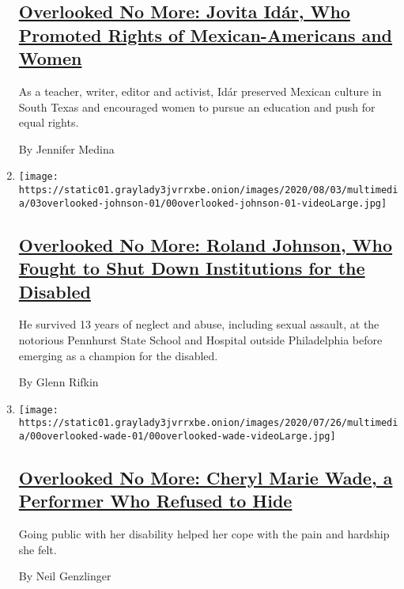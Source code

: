 \begin{enumerate}
{  \subsection{\texorpdfstring{\href{/2020/08/07/obituaries/jovita-idar-overlooked.html}{Overlooked
  No More: Jovita Idár, Who Promoted Rights of Mexican-Americans and
  Women}}{Overlooked No More: Jovita Idár, Who Promoted Rights of Mexican-Americans and Women}}\label{overlooked-no-more-jovita-iduxe1r-who-promoted-rights-of-mexican-americans-and-women}}

  As a teacher, writer, editor and activist, Idár preserved Mexican
  culture in South Texas and encouraged women to pursue an education and
  push for equal rights.

  By Jennifer Medina
\item
  \texttt{[image: https://static01.graylady3jvrrxbe.onion/images/2020/08/03/multimedia/03overlooked-johnson-01/00overlooked-johnson-01-videoLarge.jpg]}

  \hypertarget{overlooked-no-more-roland-johnson-who-fought-to-shut-down-institutions-for-the-disabled}{%
  \subsection{\texorpdfstring{\href{/2020/07/31/obituaries/roland-johnson-overlooked.html}{Overlooked
  No More: Roland Johnson, Who Fought to Shut Down Institutions for the
  Disabled}}{Overlooked No More: Roland Johnson, Who Fought to Shut Down Institutions for the Disabled}}\label{overlooked-no-more-roland-johnson-who-fought-to-shut-down-institutions-for-the-disabled}}

  He survived 13 years of neglect and abuse, including sexual assault,
  at the notorious Pennhurst State School and Hospital outside
  Philadelphia before emerging as a champion for the disabled.

  By Glenn Rifkin
\item
  \texttt{[image: https://static01.graylady3jvrrxbe.onion/images/2020/07/26/multimedia/00overlooked-wade-01/00overlooked-wade-videoLarge.jpg]}

  \hypertarget{overlooked-no-more-cheryl-marie-wade-a-performer-who-refused-to-hide}{%
  \subsection{\texorpdfstring{\href{/2020/07/23/obituaries/cheryl-marie-wade-overlooked.html}{Overlooked
  No More: Cheryl Marie Wade, a Performer Who Refused to
  Hide}}{Overlooked No More: Cheryl Marie Wade, a Performer Who Refused to Hide}}\label{overlooked-no-more-cheryl-marie-wade-a-performer-who-refused-to-hide}}

  Going public with her disability helped her cope with the pain and
  hardship she felt.

  By Neil Genzlinger
\end{enumerate}

